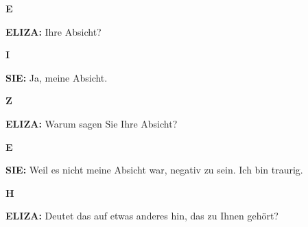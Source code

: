 \documentclass{article}
\begin{document}
\vspace{0.5cm}

\begin{minipage}[t]{0.13\textwidth}
  \centering
  {\bfseries\fontsize{14.4}{14.4}\selectfont\textcolor{pastelblue}{E}}
\end{minipage}%
\begin{minipage}[t]{0.81\textwidth}
  \textbf{ELIZA:} Ihre Absicht?
\end{minipage}

\vspace{0.5cm}

\begin{minipage}[t]{0.13\textwidth}
  \centering
  {\bfseries\fontsize{14.4}{14.4}\selectfont\textcolor{pastelblue}{I}}
\end{minipage}%
\begin{minipage}[t]{0.81\textwidth}
  \textbf{SIE:} Ja, meine Absicht.
\end{minipage}

\vspace{0.5cm}

\begin{minipage}[t]{0.13\textwidth}
  \centering
  {\bfseries\fontsize{14.4}{14.4}\selectfont\textcolor{pastelblue}{Z}}
\end{minipage}%
\begin{minipage}[t]{0.81\textwidth}
  \textbf{ELIZA:} Warum sagen Sie Ihre Absicht?
\end{minipage}

\vspace{0.5cm}

\begin{minipage}[t]{0.13\textwidth}
  \centering
  {\bfseries\fontsize{14.4}{14.4}\selectfont\textcolor{pastelblue}{E}}
\end{minipage}%
\begin{minipage}[t]{0.81\textwidth}
  \textbf{SIE:} Weil es nicht meine Absicht war, negativ zu sein. Ich bin traurig.
\end{minipage}

\vspace{0.5cm}

\begin{minipage}[t]{0.13\textwidth}
  \centering
  {\bfseries\fontsize{14.4}{14.4}\selectfont\textcolor{pastelblue}{H}}
\end{minipage}%
\begin{minipage}[t]{0.81\textwidth}
  \textbf{ELIZA:} Deutet das auf etwas anderes hin, das zu Ihnen gehört?
\end{minipage}
\end{document}
